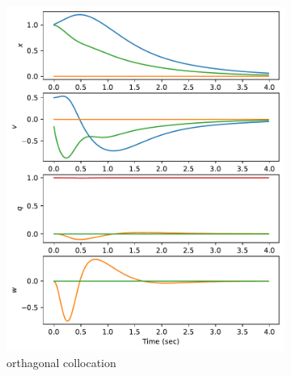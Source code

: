 \documentclass[]{article}
\begin{document}
\begin{figure}[H]
	\centering
	\begin{subfigure}[b]{0.3\textwidth}
		\centering
		\includegraphics[width=\textwidth]{statex1z1vx1.pdf}
		\caption{orthagonal collocation}
	\end{subfigure}%
	\begin{subfigure}[b]{0.3\textwidth}
		\centering

\end{subfigure}
\end{figure}
\end{document}
